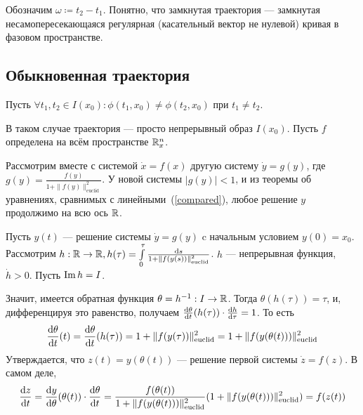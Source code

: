 \documentclass[a4paper]{report}
\begin{document}
    Обозначим $\omega \coloneqq t_2 - t_1$.
    Понятно, что замкнутая траектория --- замкнутая несамопересекающаяся регулярная (касательный вектор не нулевой) кривая в фазовом пространстве.
    \subsection{Обыкновенная траектория}
    Пусть $\forall t_1, t_2 \in I(x_0): \phi(t_1, x_0) \ne \phi(t_2, x_0)$ при $t_1 \ne t_2$.

    В таком случае траектория --- просто непрерывный образ $I(x_0)$.
    \ok
    Пусть $f$ определена на всём пространстве $\mathbb{R}^n_x$.

    Рассмотрим вместе с системой $\dot{x} = f(x)$ другую систему $\dot{y} = g(y)$, где $g(y) = \frac{f(y)}{1 + \|f(y)\|^2_{\text{euclid}}}$.
    У новой системы $|g(y)| < 1$, и из теоремы об уравнениях, сравнимых с линейными~(\ref{compared}), любое решение $y$ продолжимо на всю ось $\mathbb{R}$.

    Пусть $y(t)$ --- решение системы $\dot{y} = g(y)$ c начальным условием $y(0) = x_0$.
    Рассмотрим $h: \mathbb{R} \rightarrow \mathbb{R}, h(\tau) = \int\limits_{0}^{\tau}\frac{\operatorname{d}\! s}{1 + \|f(y(s))\|^2_{\text{euclid}}}$. $h$ --- непрерывная функция, $\dot{h} > 0$.
    Пусть $\operatorname{Im} h = I$.

    Значит, имеется обратная функция $\theta = h^{-1}: I \rightarrow \mathbb{R}$.
    Тогда $\theta(h(\tau)) = \tau$, и, дифференцируя это равенство, получаем $\frac{\operatorname{d}\! \theta}{\operatorname{d}\! t}(h(\tau)) \cdot \frac{\operatorname{d}\! h}{\operatorname{d}\! \tau} = 1$.
    То есть
    \[\frac{\operatorname{d}\!\theta}{\operatorname{d}\! t}(t) = \frac{\operatorname{d}\! \theta}{\operatorname{d}\! t}(h(\tau)) = 1 + \|f(y(\tau))\|^2_{\text{euclid}} = 1 + \|f(y(\theta(t)))\|^2_{\text{euclid}}\]
    Утверждается, что $z(t) = y(\theta(t))$ --- решение первой системы $\dot{z} = f(z)$.
    В самом деле,
    \[\frac{\operatorname{d}\! z}{\operatorname{d}\! t} = \frac{\operatorname{d}\! y}{\operatorname{d}\! \theta}(\theta(t)) \cdot \frac{\operatorname{d}\! \theta}{\operatorname{d}\! t} = \frac{f(\theta(t))}{1 + \|f(y(\theta(t)))\|^2_{\text{euclid}}}(1 + \|f(y(\theta(t)))\|^2_{\text{euclid}}) = f(z(t))\]
\end{document}
